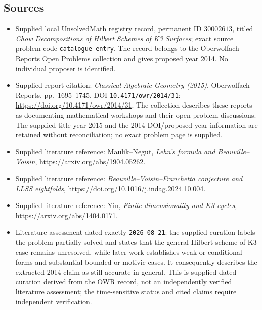 \documentclass[11pt]{article}
\begin{document}
\subsection{Sources}
\begin{itemize}
\item Supplied local UnsolvedMath registry record, permanent ID \(30002613\), titled \emph{Chow Decompositions of Hilbert Schemes of K3 Surfaces}; exact source problem code \texttt{catalogue entry}. The record belongs to the Oberwolfach Reports Open Problems collection and gives proposed year 2014. No individual proposer is identified.
\item Supplied report citation: \emph{Classical Algebraic Geometry (2015)}, Oberwolfach Reports, pp.\ 1695--1745, DOI \texttt{10.4171/owr/2014/31}: \url{https://doi.org/10.4171/owr/2014/31}. The collection describes these reports as documenting mathematical workshops and their open-problem discussions. The supplied title year 2015 and the 2014 DOI/proposed-year information are retained without reconciliation; no exact problem page is supplied.
\item Supplied literature reference: Maulik--Negut, \emph{Lehn's formula and Beauville--Voisin}, \url{https://arxiv.org/abs/1904.05262}.
\item Supplied literature reference: \emph{Beauville--Voisin--Franchetta conjecture and LLSS eightfolds}, \url{https://doi.org/10.1016/j.indag.2024.10.004}.
\item Supplied literature reference: Yin, \emph{Finite-dimensionality and K3 cycles}, \url{https://arxiv.org/abs/1404.0171}.
\item Literature assessment dated exactly \texttt{2026-08-21}: the supplied curation labels the problem partially solved and states that the general Hilbert-scheme-of-K3 case remains unresolved, while later work establishes weak or conditional forms and substantial bounded or motivic cases. It consequently describes the extracted 2014 claim as still accurate in general. This is supplied dated curation derived from the OWR record, not an independently verified literature assessment; the time-sensitive status and cited claims require independent verification.
\end{itemize}
\end{document}
